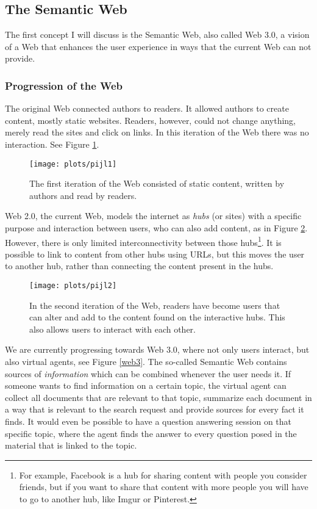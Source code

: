 \documentclass{article}
\begin{document}
 \subsection{The Semantic Web}
  The first concept I will discuss is the Semantic Web, also called Web 3.0, a vision of a Web that enhances the user experience in ways that the current Web can not provide.
 \subsubsection{Progression of the Web}
 The original Web connected authors to readers. It allowed authors to create content, mostly static websites. Readers, however, could not change anything, merely read the sites and click on links. In this iteration of the Web there was no interaction\cite{web1}. See Figure \ref{web1}. 
 
 \begin{figure}[H]
 \centering
 \texttt{[image: plots/pijl1]}
 \caption[Web 1.0]{The first iteration of the Web consisted of static content, written by authors and read by readers.}
 \label{web1}
 \end{figure}
 
 Web 2.0, the current Web, models the internet as \textit{hubs} (or sites) with a specific purpose and interaction between users, who can also add content, as in Figure \ref{web2}. However, there is only limited interconnectivity between those hubs\footnote{For example, Facebook is a hub for sharing content with people you consider friends, but if you want to share that content with more people you will have to go to another hub, like Imgur or Pinterest.}\cite{web2}.
 It is possible to link to content from other hubs using URLs, but this moves the user to another hub, rather than connecting the content present in the hubs.
 
 \begin{figure}[H]
 \centering
 \texttt{[image: plots/pijl2]}
 \caption[Web 2.0]{In the second iteration of the Web, readers have become users that can alter and add to the content found on the interactive hubs. This also allows users to interact with each other.}
 \label{web2}
 \end{figure}
 
 We are currently progressing towards Web 3.0, where not only users interact, but also virtual agents, see Figure \ref{web3}. The so-called Semantic Web contains sources of \textit{information} which can be combined whenever the user needs it. 
 If someone wants to find information on a certain topic, the virtual agent can collect all documents that are relevant to that topic, summarize each document in a way that is relevant to the search request and provide sources for every fact it finds. It would even be possible to have a question answering session on that specific topic, where the agent finds the answer to every question posed in the material that is linked to the topic.
 
\end{document}
